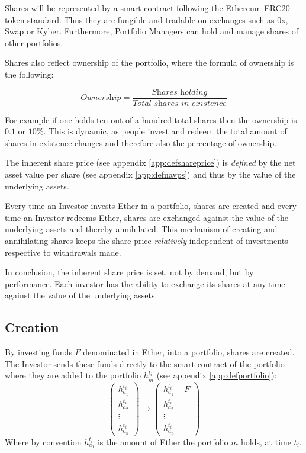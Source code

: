 \documentclass[9pt,oneside]{amsart}
\theoremstyle{plain}
\begin{document}
\begin{multicols}{2}
Shares will be represented by a smart-contract following the Ethereum ERC20 token standard\cite{tokenstandard}. Thus they are fungible and tradable on exchanges such as 0x\cite{0xProject}, Swap\cite{swap} or Kyber\cite{kyber}. Furthermore, Portfolio Managers can hold and manage shares of other portfolios.

Shares also reflect ownership of the portfolio, where the formula of ownership is the following:

\begin{equation}
	\textit{Ownership} = \frac{\textit{Shares holding}}{\textit{Total shares in existence}}
\end{equation}

For example if one holds ten out of a hundred total shares then the ownership is $0.1$ or $10\%$. This is dynamic, as people invest and redeem the total amount of shares in existence changes and therefore also the percentage of ownership. 

The inherent share price (see appendix \ref{app:defshareprice}) is \textit{defined} by the net asset value per share (see appendix \ref{app:defnavps}) and thus by the value of the underlying assets.

Every time an Investor invests Ether in a portfolio, shares are created and every time an Investor redeems Ether, shares are exchanged against the value of the underlying assets and thereby annihilated. This mechanism of creating and annihilating shares keeps the share price \textit{relatively} independent of investments respective to withdrawals made.

In conclusion, the inherent share price is set, not by demand, but by performance. Each investor has the ability to exchange its shares at any time against the value of the underlying assets. 

\subsection{Creation}\label{sub:creation}

By investing funds $F$ denominated in Ether, into a portfolio, shares are created. The Investor sends these funds directly to the smart contract of the portfolio where they are added to the portfolio $\underline{h}_m^{t_i}$ (see appendix \ref{app:defportfolio}):
\begin{equation*}
	\begin{pmatrix}
		h_{a_{1}}^{t_i}\\
		h_{a_{2}}^{t_i}\\
		\vdots \\
		h_{a_{n}}^{t_i}
	\end{pmatrix}
	\rightarrow
	\begin{pmatrix}
		h_{a_{1}}^{t_i} + F\\
		h_{a_{2}}^{t_i}\\
		\vdots \\
		h_{a_{n}}^{t_i}
	\end{pmatrix}
\end{equation*}
Where by convention $h_{a_{1}}^{t_i}$ is the amount of Ether the portfolio $m$ holds, at time $t_i$.


\end{multicols}
\end{document}
